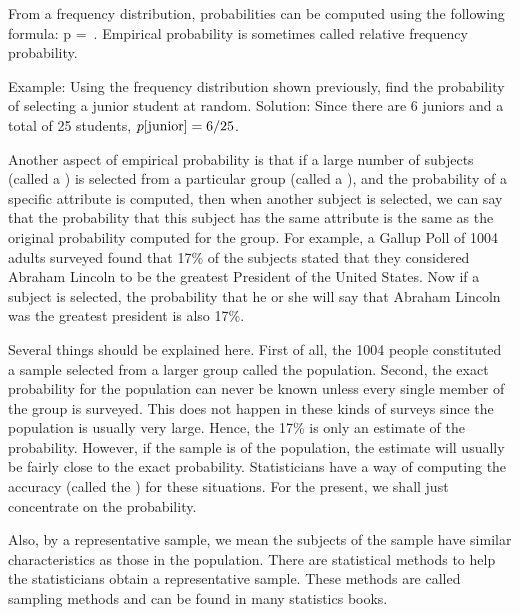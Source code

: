 From a frequency distribution, probabilities can be computed using the following formula:
\beq
p = \,.
\eeq
Empirical probability is sometimes called relative frequency probability.


Example: Using the frequency distribution shown previously, find the probability of selecting a junior student at random.
Solution: Since there are 6 juniors and a total of 25 students, $p\!\left[{\text{junior}}\right] = 6/25$.

Another aspect of empirical probability is that if a large number of subjects (called a ) is selected from a particular group (called a ), and the probability of a specific attribute is computed, then when another subject is selected, we can say that the probability that this subject has the same attribute is the same as the original probability computed for the group. For example, a Gallup Poll of 1004 adults surveyed found that 17\% of the subjects stated that they considered Abraham Lincoln to be the greatest President of the United States. Now if a subject is selected, the probability that he or she will say that Abraham Lincoln was the greatest president is also 17\%.

Several things should be explained here. First of all, the 1004 people constituted a sample selected from a larger group called the population. Second, the exact probability for the population can never be known unless every single member of the group is surveyed. This does not happen in these kinds of surveys since the population is usually very large. Hence, the 17\% is only an estimate of the probability. However, if the sample is  of the population, the estimate will usually be fairly close to the exact probability. Statisticians have a way of computing the accuracy (called the ) for these situations. For the present, we shall just concentrate on the probability.

Also, by a representative sample, we mean the subjects of the sample have similar characteristics as those in the population. There are statistical methods to help the statisticians obtain a representative sample. These methods are called sampling methods and can be found in many statistics books.


